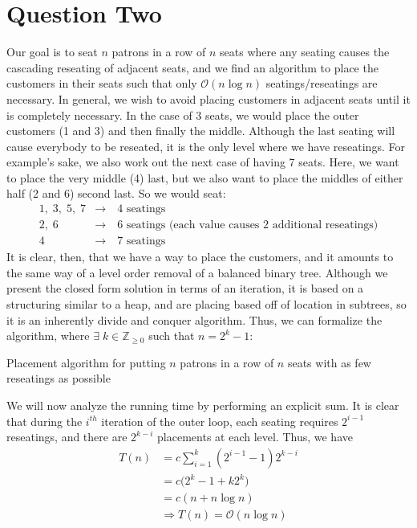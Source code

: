 \documentclass[11pt,letterpaper]{article}
\begin{document}
\section*{Question Two}
Our goal is to seat $n$ patrons in a row of $n$ seats where any seating causes the cascading reseating of adjacent seats, and we find an algorithm to place the customers in their seats such that only $\mathcal{O}(n \log n)$ seatings/reseatings are necessary. In general, we wish to avoid placing customers in adjacent seats until it is completely necessary. In the case of 3 seats, we would place the outer customers (1 and 3) and then finally the middle. Although the last seating will cause everybody to be reseated, it is the only level where we have reseatings. For example's sake, we also work out the next case of having 7 seats. Here, we want to place the very middle (4) last, but we also want to place the middles of either half (2 and 6) second last. So we would seat: 
\begin{align*}
	1, \; 3,\;5,\;7 &\rightarrow \quad \mbox{4 seatings} \\
	2,\;6 &\rightarrow \quad \mbox{6 seatings (each value causes 2 additional reseatings)} \\
	4 &\rightarrow \quad \mbox{7 seatings}
\end{align*}
It is clear, then, that we have a way to place the customers, and it amounts to the same way of a level order removal of a balanced binary tree. Although we present the closed form solution in terms of an iteration, it is based on a structuring similar to a heap, and are placing based off of location in subtrees, so it is an inherently divide and conquer algorithm. Thus, we can formalize the algorithm, where $\exists \; k \in \mathbb{Z}_{\geq 0}$ such that $n = 2^{k} - 1$:
\begin{algorithm}
	\caption{Placement algorithm for putting $n$ patrons in a row of $n$ seats with as few reseatings as possible}
\end{algorithm}

We will now analyze the running time by performing an explicit sum. It is clear that during the $i^{th}$ iteration of the outer loop, each seating requires $2^{i-1}$ reseatings, and there are $2^{k-i}$ placements at each level. Thus, we have 
\begin{align*}
	T(n) &= c \sum_{i=1}^{k} (2^{i-1}-1) 2^{k-i} \\
	&= c\Big(2^k - 1 + k 2^k\Big) \\
	&= c(n + n \log n) \\
	&\Rightarrow T(n) = \mathcal{O}(n \log n)
\end{align*}
	
\end{document}
